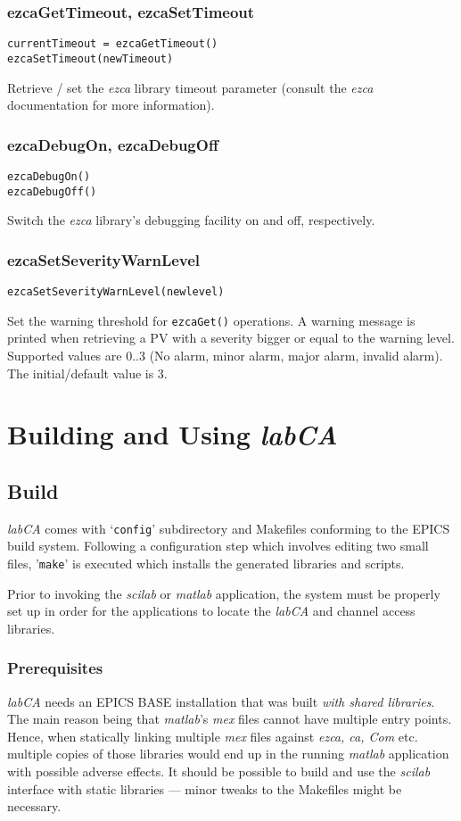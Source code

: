 \documentclass{article}
\newcommand{\sca}{{\em labCA}}
\newcommand{\scilab}{{\em scilab}}
\newcommand{\matlab}{{\em matlab}}
\newcommand{\ezca}{{\em ezca}}
\newcommand{\com}[1]{{\tt #1}}
\begin{document}
\subsubsection{ezcaGetTimeout, ezcaSetTimeout}
\begin{verbatim}
currentTimeout = ezcaGetTimeout()
ezcaSetTimeout(newTimeout)
\end{verbatim}
Retrieve / set the \ezca{} library timeout parameter (consult the \ezca{}
documentation for more information).

\subsubsection{ezcaDebugOn, ezcaDebugOff}
\begin{verbatim}
ezcaDebugOn()
ezcaDebugOff()
\end{verbatim}
Switch the \ezca{} library's debugging facility on and off, respectively.

\subsubsection{ezcaSetSeverityWarnLevel}
\label{swarnlevel}
\begin{verbatim}
ezcaSetSeverityWarnLevel(newlevel)
\end{verbatim}
Set the warning threshold for \com{ezcaGet()} operations.
A warning message is printed when retrieving a PV with a severity bigger
or equal to the warning level. Supported values are $0..3$ (No alarm,
minor alarm, major alarm, invalid alarm). The initial/default value is 3.

\section{Building and Using \sca{}}
\subsection{Build}
\sca{} comes with `{\tt config}' subdirectory and Makefiles conforming to the
EPICS build system. Following a configuration step which involves editing
two small files, '{\tt make}' is executed which installs the generated libraries
and scripts.

Prior to invoking the \scilab{} or \matlab{} application, the system
must be properly set up in order for the applications to locate the
\sca{} and channel access libraries.

\subsubsection{Prerequisites}
\sca{} needs an EPICS BASE installation that was built {\em with shared
libraries}. The main reason being that \matlab's {\em mex} files cannot
have multiple entry points. Hence, when statically linking multiple {\em mex}
files against {\em ezca, ca, Com} etc. multiple copies of those libraries
would end up in the running \matlab{} application with possible adverse
effects. It should be possible to build and use the \scilab{} interface
with static libraries --- minor tweaks to the Makefiles might be necessary.
\end{document}
